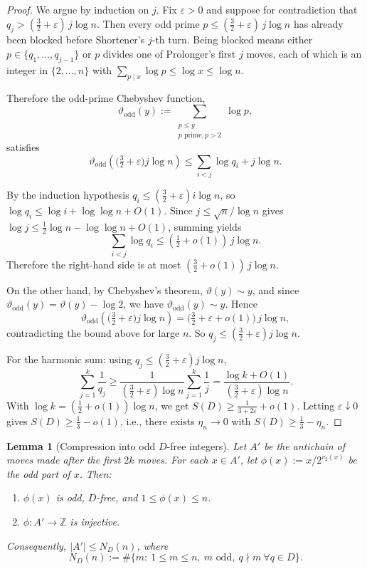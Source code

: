 \documentclass{article}
\newtheorem{lemma}{Lemma}
\begin{document}
\begin{proof}
We argue by induction on $j$. Fix $\varepsilon > 0$ and suppose for contradiction that $q_j > (\tfrac{3}{2} + \varepsilon)\, j \log n$. Then every odd prime $p \le (\tfrac{3}{2} + \varepsilon)\, j \log n$ has already been blocked before Shortener's $j$-th turn. Being blocked means either $p \in \{q_1, \ldots, q_{j-1}\}$ or $p$ divides one of Prolonger's first $j$ moves, each of which is an integer in $\{2, \ldots, n\}$ with $\sum_{p \mid x} \log p \le \log x \le \log n$.

Therefore the odd-prime Chebyshev function,
\[
\vartheta_{\mathrm{odd}}(y) := \sum_{\substack{p \le y \\ p \text{ prime}, p > 2}} \log p,
\]
satisfies
\[
\vartheta_{\mathrm{odd}}\!\left(\bigl(\tfrac{3}{2} + \varepsilon\bigr) j \log n\right) \le \sum_{i < j} \log q_i + j \log n.
\]

By the induction hypothesis $q_i \le (\tfrac{3}{2} + \varepsilon) i \log n$, so $\log q_i \le \log i + \log \log n + O(1)$. Since $j \le \sqrt{n}/\log n$ gives $\log j \le \tfrac{1}{2} \log n - \log\log n + O(1)$, summing yields
\[
\sum_{i < j} \log q_i \le (\tfrac{1}{2} + o(1))\, j \log n.
\]
Therefore the right-hand side is at most $(\tfrac{3}{2} + o(1))\, j \log n$.

On the other hand, by Chebyshev's theorem, $\vartheta(y) \sim y$, and since $\vartheta_{\mathrm{odd}}(y) = \vartheta(y) - \log 2$, we have $\vartheta_{\mathrm{odd}}(y) \sim y$. Hence
\[
\vartheta_{\mathrm{odd}}\!\left(\bigl(\tfrac{3}{2} + \varepsilon\bigr) j \log n\right) = \bigl(\tfrac{3}{2} + \varepsilon + o(1)\bigr)\, j \log n,
\]
contradicting the bound above for large $n$. So $q_j \le (\tfrac{3}{2} + \varepsilon) j \log n$.

For the harmonic sum: using $q_j \le (\tfrac{3}{2} + \varepsilon) j \log n$,
\[
\sum_{j=1}^{k} \frac{1}{q_j} \ge \frac{1}{(\tfrac{3}{2} + \varepsilon)\log n} \sum_{j=1}^{k} \frac{1}{j} = \frac{\log k + O(1)}{(\tfrac{3}{2} + \varepsilon) \log n}.
\]
With $\log k = (\tfrac{1}{2} + o(1))\log n$, we get $S(D) \ge \tfrac{1}{3 + 2\varepsilon} + o(1)$. Letting $\varepsilon \downarrow 0$ gives $S(D) \ge \tfrac{1}{3} - o(1)$, i.e., there exists $\eta_n \to 0$ with $S(D) \ge \tfrac{1}{3} - \eta_n$.
\end{proof}

\begin{lemma}[Compression into odd $D$-free integers]
\label{lem:compression}
Let $A'$ be the antichain of moves made after the first $2k$ moves. For each $x \in A'$, let $\phi(x) := x / 2^{v_2(x)}$ be the odd part of $x$. Then:
\begin{enumerate}
  \item $\phi(x)$ is odd, $D$-free, and $1 \le \phi(x) \le n$.
  \item $\phi: A' \to \mathbb{Z}$ is injective.
\end{enumerate}

Consequently, $|A'| \le N_D(n)$, where
\[
N_D(n) := \#\{m :\ 1 \le m \le n,\ m \text{ odd},\ q \nmid m\ \forall q \in D\}.
\]
\end{lemma}
\end{document}
